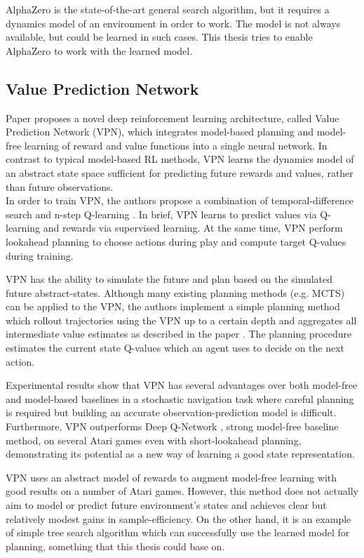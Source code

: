 AlphaZero is the state-of-the-art general search algorithm, but it requires a dynamics model of an environment in order to work. The model is not always available, but could be learned in such cases. This thesis tries to enable AlphaZero to work with the learned model.

\subsection{Value Prediction Network}

Paper \cite{Algo.VPN} proposes a novel deep reinforcement learning architecture, called Value Prediction Network (VPN), which integrates model-based planning and model-free learning of reward and value functions into a single neural network. In contrast to typical model-based RL methods, VPN learns the dynamics model of an abstract state space sufficient for predicting future rewards and values, rather than future observations. \\
In order to train VPN, the authors propose a combination of temporal-difference search \cite{Algo.TDSearch} and n-step Q-learning \cite{Algo.A3C}. In brief, VPN learns to predict values via Q-learning and rewards via supervised learning. At the same time, VPN perform lookahead planning to choose actions during play and compute target Q-values during training.

VPN has the ability to simulate the future and plan based on the simulated future abstract-states. Although many existing planning methods (e.g. MCTS) can be applied to the VPN, the authors implement a simple planning method which rollout trajectories using the VPN up to a certain depth and aggregates all intermediate value estimates as described in the paper \cite{Algo.VPN}. The planning procedure estimates the current state Q-values which an agent uses to decide on the next action.

Experimental results show that VPN has several advantages over both model-free and model-based baselines in a stochastic navigation task where careful planning is required but building an accurate observation-prediction model is difficult. Furthermore, VPN outperforms Deep Q-Network \cite{Algo.DQN}, strong model-free baseline method, on several Atari games even with short-lookahead planning, demonstrating its potential as a new way of learning a good state representation.

VPN uses an abstract model of rewards to augment model-free learning with good results on a number of Atari games. However, this method does not actually aim to model or predict future environment's states and achieves clear but relatively modest gains in sample-efficiency. On the other hand, it is an example of simple tree search algorithm which can successfully use the learned model for planning, something that this thesis could base on.
